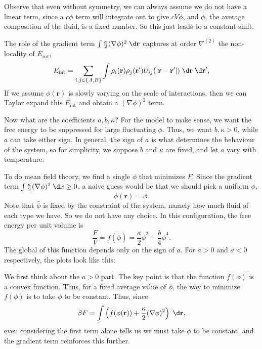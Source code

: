\documentclass[a4paper]{article}
\begin{document}
Observe that even without symmetry, we can always assume we do not have a linear term, since a $c \phi$ term will integrate out to give $cV \bar{\phi}$, and $\bar{\phi}$, the average composition of the fluid, is a fixed number. So this just leads to a constant shift.

The role of the gradient term $\int \frac{\kappa}{2} (\nabla \phi)^2 \;\d \mathbf{r}$ captures at order $\nabla^{(2)}$ the non-locality of $E_{int}$,
\[
  E_{\mathrm{int}} = \sum_{i, j \in \{A, B\}} \int \rho_i (\mathbf{r}) \rho_j(\mathbf{r}') U_{ij}(|\mathbf{r} - \mathbf{r}'|)\;\d \mathbf{r}\;\d \mathbf{r}',
\]
If we assume $\phi(\mathbf{r})$ is slowly varying on the scale of interactions, then we can Taylor expand this $E_{\mathrm{int}}$ and obtain a $(\nabla \phi)^2$ term.

Now what are the coefficients $a, b, \kappa$? For the model to make sense, we want the free energy to be suppressed for large fluctuating $\phi$. Thus, we want $b, \kappa > 0$, while $a$ can take either sign. In general, the sign of $a$ is what determines the behaviour of the system, so for simplicity, we suppose $b$ and $\kappa$ are fixed, and let $a$ vary with temperature.

To do mean field theory, we find a single $\phi$ that minimizes $F$. Since the gradient term $\int \frac{\kappa}{2} (\nabla \phi)^2\;\d x \geq 0$, a naive guess would be that we should pick a uniform $\phi$,
\[
  \phi(\mathbf{r}) = \bar{\phi}.
\]
Note that $\bar{\phi}$ is fixed by the constraint of the system, namely how much fluid of each type we have. So we do not have any choice. In this configuration, the free energy per unit volume is
\[
  \frac{F}{V} = f(\bar{\phi}) = \frac{a}{2} \bar{\phi}^2 + \frac{b}{4} \bar{\phi}^4.
\]
The global of this function depends only on the sign of $a$. For $a > 0$ and $a < 0$ respectively, the plots look like this:
\begin{center}
\end{center}
We first think about the $a > 0$ part. The key point is that the function $f(\phi)$ is a convex function. Thus, for a fixed average value of $\phi$, the way to minimize $f(\phi)$ is to take $\phi$ to be constant. Thus, since
\[
  \beta F = \int \left(f(\phi(\mathbf{r})) + \frac{\kappa}{2} (\nabla \phi)^2\right)\;\d \mathbf{r},
\]
even considering the first term alone tells us we must take $\phi$ to be constant, and the gradient term reinforces this further.
\end{document}
